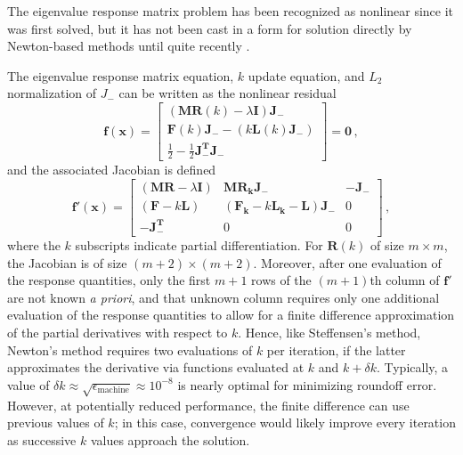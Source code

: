 The eigenvalue response matrix problem has been recognized as 
nonlinear since it was first solved, but it has not 
been cast in a form for solution directly by 
Newton-based methods until quite 
recently \cite{roberts2011ser, roberts2010ncm}.  

The eigenvalue response matrix equation, $k$ update equation, 
and $L_2$ normalization of $J_{-}$ can be written as the nonlinear 
residual
    \begin{equation}
    \mathbf{f(x)} = \left [\begin{array}{c}
            (\mathbf{M}\mathbf{R}(k)-\lambda \mathbf{I}) \mathbf{J_-} \\
            \mathbf{F}(k)\mathbf{J_-} - (k\mathbf{L}(k)\mathbf{J_-} ) \\
            \frac{1}{2}-\frac{1}{2} \mathbf{J^T_-} \mathbf{J_-}   
          \end{array} 
    \right ]  = \mathbf{0} \, ,
    \label{eq:residual}
    \end{equation}
and the associated  Jacobian is defined
  \begin{equation}
  \mathbf{f'(x)} = \left [\begin{array}{ccc}
          (\mathbf{M}\mathbf{R}-\lambda \mathbf{I})  
          &  \mathbf{M}\mathbf{R_k}\mathbf{J_-}                     
          & \mathbf{-J_-}  \\
          (\mathbf{F}-k\mathbf{L})                   
          &  (\mathbf{F_k}-k\mathbf{L_k}-\mathbf{L}) \mathbf{J_-}   
          & 0  \\
          \mathbf{-J^T_-}                             
          & 0                                                       
          & 0
        \end{array} 
  \right ]  \, ,
  \label{eq:jacobian}
  \end{equation}
where the $k$ subscripts indicate partial differentiation.
For $\mathbf{R}(k)$ of size $m\times m$, the Jacobian is of 
size $(m+2)\times(m+2)$.  Moreover, after one evaluation of 
the response quantities, only the first $m+1$ rows of the $(m+1)$th 
column of $\mathbf{f'}$ are not known {\it a priori}, and that 
unknown column requires only one additional evaluation of the 
response quantities to allow for a finite difference 
approximation of the partial derivatives with respect to $k$.
Hence, like Steffensen's method, Newton's method requires two 
evaluations of $k$ per iteration, if the latter approximates the 
derivative via functions evaluated at $k$ and $k + \delta k$.  
Typically, a value of 
$\delta k \approx \sqrt{\epsilon_{\text{machine}}} \approx 10^{-8}$
is nearly optimal for minimizing roundoff error.  However, at potentially 
reduced performance, the finite difference can use previous values 
of $k$;  in this case, convergence would likely improve every 
iteration as successive $k$ 
values approach the solution.  

